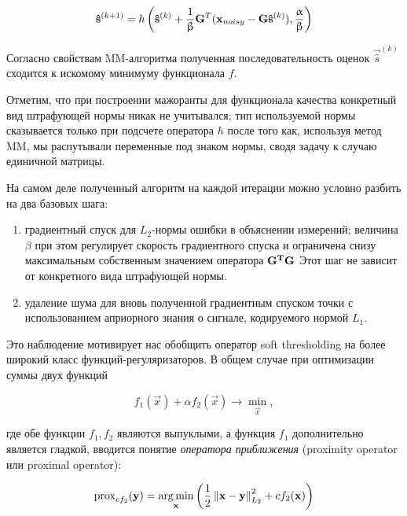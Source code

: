 \begin{equation}
    \mathbf{\hat{s}}^{(k+1)} = h\left(\mathbf{\hat{s}}^{(k)} + \frac{1}{\upbeta} \mathbf{G}^T(\mathbf{x}_{noisy} - \mathbf{G} \mathbf{\hat{s}}^{(k)}), \frac{\upalpha}{\upbeta}\right)
    \label{eq:fista_next_iter_soft_thresh}
\end{equation}

Согласно свойствам MM-алгоритма полученная последовательность оценок
$\vec{\hat{s}}^{(k)}$ сходится к искомому минимуму функционала $f$.

Отметим, что при построении мажоранты для функционала качества конкретный вид
штрафующей нормы никак не учитывался; тип используемой нормы сказывается только
при подсчете оператора $h$ после того как, используя метод MM, мы распутывали
переменные под знаком нормы, сводя задачу к случаю единичной матрицы.

На самом деле полученный алгоритм на каждой итерации можно условно разбить на два базовых
шага: 

\begin{enumerate}
    \item градиентный спуск для $L_2$-нормы ошибки в объяснении измерений;
        величина $\beta$ при этом регулирует скорость градиентного спуска и ограничена
        снизу максимальным собственным значением оператора $\mathbf{G^TG}$
        Этот шаг не зависит от конкретного вида штрафующей нормы.
    \item удаление шума для вновь полученной градиентным спуском точки с
        использованием априорного знания о сигнале, кодируемого нормой $L_1$.
\end{enumerate}

Это наблюдение мотивирует нас обобщить оператор soft thresholding на
более широкий класс функций-регуляризаторов. В общем случае
при оптимизации суммы двух функций

\begin{equation}
    f_1(\vec{x}) + \alpha f_2(\vec{x}) \rightarrow \underset{\vec{x}}\min,
\end{equation}

где обе функции $f_1, f_2$ являются выпуклыми, а функция $f_1$ дополнительно
является гладкой, вводится понятие \emph{оператора приближения} (proximity
operator или proximal operator):

\begin{equation}
    \operatorname{prox}_{c f_2}(\mathbf{y}) = \operatorname*{arg\,min}_{\mathbf{x}}\left(\frac{1}{2}\left\lVert\mathbf{x - y}\right\rVert^2_{L_2} + c f_2(\mathbf{x})\right)
    \label{eq:prox_operator_def}
\end{equation}

